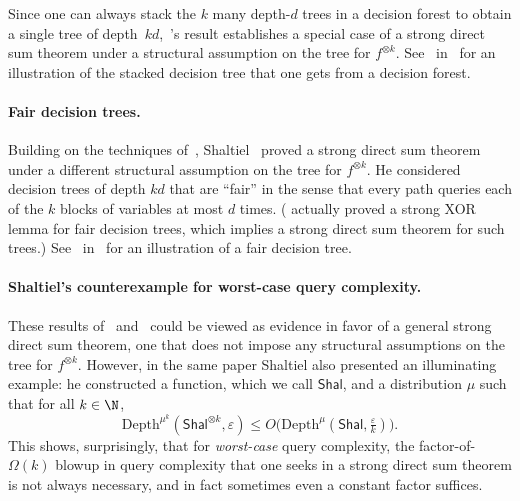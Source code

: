 Since one can always stack the $k$ many depth-$d$ trees in a decision forest to obtain a single tree of depth~$kd$,~\cite{NRS94}'s result establishes a special case of a strong direct sum theorem under a structural assumption on the tree for $f^{\otimes k}$. See~ in~ for an illustration of the stacked decision tree that one gets from a decision forest. 



\paragraph{Fair decision trees.} Building on the techniques of~\cite{NRS94}, Shaltiel~\cite{Sha04} proved a strong direct sum theorem under a different structural assumption on the tree for $f^{\otimes k}$. He considered decision trees of depth $kd$ that are “fair” in the sense that every path queries each of the $k$ blocks of variables at most $d$ times. (\cite{Sha04} actually proved a strong XOR lemma for fair decision trees, which implies a strong direct sum theorem for such trees.) See~ in~ for an illustration of a fair decision tree. 



\paragraph{Shaltiel's counterexample for worst-case query complexity.}

These results of~\cite{NRS94} and~\cite{Sha04} could be viewed as evidence in favor of a general strong direct sum theorem, one that does not impose any structural assumptions on the tree for $f^{\otimes k}$. However, in the same paper Shaltiel also presented an illuminating example: he constructed a function, which we call $\mathsf{Shal}$, and a distribution $\mu$ such that for all $k\in \N$,%
\begin{equation} 
\mathrm{Depth}^{\mu^k}(\mathsf{Shal}^{\otimes k},\varepsilon) \le O\big(\mathrm{Depth}^{\mu}(\mathsf{Shal},\tfrac{\varepsilon}{k})\big).
\label{eq:shaltiel}
\end{equation}
This shows, surprisingly, that for {\sl worst-case} query complexity, the factor-of-$\Omega(k)$ blowup in query complexity that one seeks in a strong direct sum theorem is not always necessary, and in fact sometimes even a constant factor suffices. 

